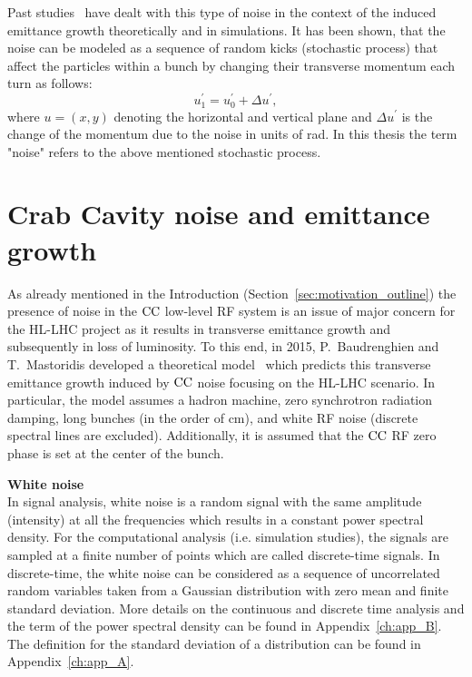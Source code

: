 Past studies~\cite{Lebedev:248620, Lebedev:248622, PhysRevSTAB.18.101001} have dealt with this type of noise in the context of the induced emittance growth theoretically and in simulations. It has been shown, that the noise can be modeled as a sequence of random kicks (stochastic process) that affect the particles within a bunch by changing their transverse momentum each turn as follows:
\begin{equation}\label{eq:external_noise_kicks}
    u^\prime_1 =  u^\prime_0 + \Delta u^\prime,
\end{equation}
where $u=(x,y)$ denoting the horizontal and vertical plane and $\Delta u^\prime$ is the change of the momentum due to the noise in units of rad. In this thesis the term "noise" refers to the above mentioned stochastic process.


\section{Crab Cavity noise and emittance growth}\label{eq:CC_noise_intro}
As already mentioned in the Introduction (Section~\ref{sec:motivation_outline}) the presence of noise in the ${\mathrm{CC}}$ low-level RF system is an issue of major concern for the HL-LHC project as it results in transverse emittance growth and subsequently in loss of luminosity. To this end, in 2015, P.~Baudrenghien and T.~Mastoridis developed a theoretical model~\cite{PhysRevSTAB.18.101001} which predicts this transverse emittance growth induced by ${\mathrm{CC}}$ noise focusing on the HL-LHC scenario. In particular, the model assumes a hadron machine, zero synchrotron radiation damping, long bunches (in the order of cm), and white RF noise (discrete spectral lines are excluded).  Additionally, it is assumed that the ${\mathrm{CC}}$ RF zero phase is set at the center of the bunch.

\textbf{White noise}\\
In signal analysis, white noise is a random signal with the same amplitude (intensity) at all the frequencies which results in a constant power spectral density. For the computational analysis (i.e. simulation studies), the signals are sampled at a finite number of points which are called discrete-time signals. In discrete-time, the white noise can be considered as a sequence of uncorrelated random variables taken from a Gaussian distribution with zero mean and finite standard deviation. More details on the continuous and discrete time analysis and the term of the power spectral density can be found in Appendix~\ref{ch:app_B}. The definition for the standard deviation of a distribution can be found in Appendix~\ref{ch:app_A}.

